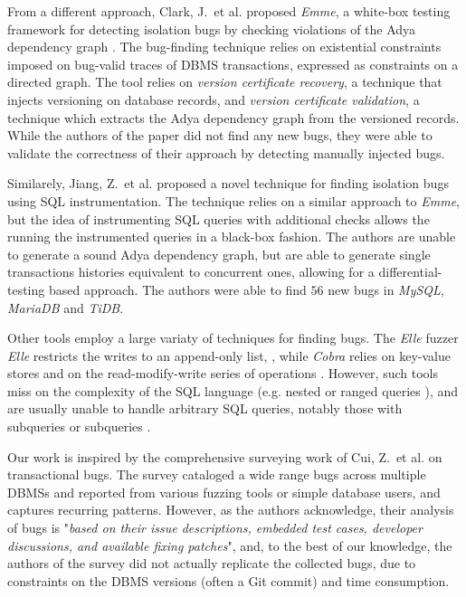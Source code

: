 From a different approach, Clark, J.\ et al. \cite{clark2024validating} proposed \textit{Emme}, a white-box testing framework for detecting isolation bugs by checking violations of the Adya dependency graph \cite{adya1999weak}. The bug-finding technique relies on existential constraints imposed on bug-valid traces of DBMS transactions, expressed as constraints on a directed graph. The tool relies on \textit{version certificate recovery}, a technique that injects versioning on database records, and \textit{version certificate validation}, a technique which extracts the Adya dependency graph from the versioned records. While the authors of the paper did not find any new bugs, they were able to validate the correctness of their approach by detecting manually injected bugs.

Similarely, Jiang, Z.\ et al. \cite{jiang2023detecting} proposed a novel technique for finding isolation bugs using SQL instrumentation. The technique relies on a similar approach to \textit{Emme}, but the idea of instrumenting SQL queries with additional checks allows the running the instrumented queries in a black-box fashion. The authors are unable to generate a sound Adya dependency graph, but are able to generate single transactions histories equivalent to concurrent ones, allowing for a differential-testing based approach. The authors were able to find $56$ new bugs in \textit{MySQL}, \textit{MariaDB} and \textit{TiDB}.

Other tools employ a large variaty of techniques for finding bugs. The \textit{Elle} fuzzer \textit{Elle} restricts the writes to an append-only list, \cite{kingsbury2020elle}, while \textit{Cobra} relies on key-value stores and on the read-modify-write series of operations \cite{tan2020cobra}. However, such tools miss on the complexity of the SQL language (e.g. nested or ranged queries \cite{jiang2023dynsql}), and are usually unable to handle arbitrary SQL queries, notably those with subqueries or subqueries \cite{levy1994query}.

Our work is inspired by the comprehensive surveying work of Cui, Z.\ et al. \cite{cui2024understanding_ICSE2024} on transactional bugs. The survey cataloged a wide range bugs across multiple DBMSs and reported from various fuzzing tools or simple database users, and captures recurring patterns. However, as the authors acknowledge, their analysis of bugs is "\textit{based on their issue descriptions, embedded test cases, developer discussions, and available fixing patches}", and, to the best of our knowledge, the authors of the survey did not actually replicate the collected bugs, due to constraints on the DBMS versions (often a Git commit) and time consumption.

